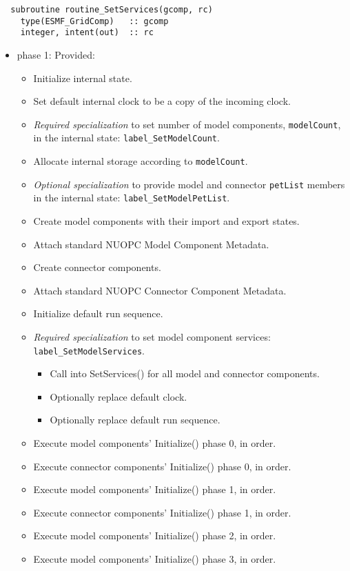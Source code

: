 \begin{verbatim}  subroutine routine_SetServices(gcomp, rc)
    type(ESMF_GridComp)   :: gcomp
    integer, intent(out)  :: rc
\end{verbatim}

\begin{itemize}
\item phase 1: {\sc Provided:}
  \begin{itemize}
  \item Initialize internal state.
  \item Set default internal clock to be a copy of the incoming clock.
  \item {\it Required specialization} to set number of model components, {\tt modelCount}, in the internal state: {\tt label\_SetModelCount}.
  \item Allocate internal storage according to {\tt modelCount}.
  \item {\it Optional specialization} to provide model and connector {\tt petList} members in the internal state: {\tt label\_SetModelPetList}.
  \item Create model components with their import and export states.
  \item Attach standard NUOPC Model Component Metadata.
  \item Create connector components.
  \item Attach standard NUOPC Connector Component Metadata.
  \item Initialize default run sequence.
  \item {\it Required specialization} to set model component services: {\tt label\_SetModelServices}. 
  \begin{itemize}
    \item Call into SetServices() for all model and connector components.
    \item Optionally replace default clock. 
    \item Optionally replace default run sequence.
  \end{itemize}
  \item Execute model components' Initialize() phase 0, in order.
  \item Execute connector components' Initialize() phase 0, in order.
  \item Execute model components' Initialize() phase 1, in order.
  \item Execute connector components' Initialize() phase 1, in order.
  \item Execute model components' Initialize() phase 2, in order.
  \item Execute model components' Initialize() phase 3, in order.
  \end{itemize}  
\end{itemize}

